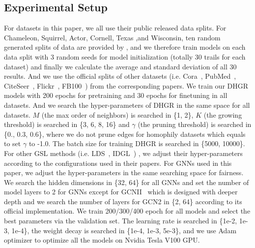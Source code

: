 \documentclass[sigconf]{acmart}
\begin{document}
	\subsection{Experimental Setup}
	For datasets in this paper, we all use their public released data splits. For Chameleon, Squirrel, Actor, Cornell, Texas ,and Wisconsin, ten random generated splits of data are provided by \cite{pei2020geom}, and we therefore train models on each data split with 3 random seeds for model initialization (totally 30 trails for each dataset) and finally we calculate the average and standard deviation of all 30 results. And we use the official splits of other datasets (i.e. Cora~\cite{GCN}, PubMed~\cite{GCN}, CiteSeer~\cite{GCN}, Flickr~\cite{zeng2019graphsaint}, FB100~\cite{lim2021new}) from the corresponding papers. We train our DHGR models with 200 epochs for pretraining and 30 epochs for finetuning in all datasets. And we search the hyper-parameters of DHGR in the same space for all datasets. $M$ (the max order of neighbors) is searched in \{1, 2\}, $K$ (the growing threshold) is searched in \{3, 6, 8, 16\} and $\gamma$ (the pruning threshold) is searched in \{0., 0.3, 0.6\}, where we do not prune edges for homophily datasets which equals to set $\gamma$ to -1.0. The batch size for training DHGR is searched in \{5000, 10000\}. For other GSL methods (i.e. LDS~\cite{LDS}, IDGL~\cite{chen2020iterative}) , we adjust their hyper-parameters according to the configurations used in their papers. For GNNs used in this paper, we adjust the hyper-parameters in the same searching space for fairness. We search the hidden dimensions in \{32, 64\} for all GNNs and set the number of model layers to 2 for GNNs except for GCNII~\cite{GCN2} which is designed with deeper depth and we search the number of layers for GCN2 in \{2, 64\} according to its official implementation. We train 200/300/400 epoch for all models and select the best parameters via the validation set.  The learning rate is searched in \{1e-2, 1e-3, 1e-4\}, the weight decay is searched in \{1e-4, 1e-3, 5e-3\}, and we use Adam optimizer to optimize all the models on Nvidia Tesla V100 GPU. 
\end{document}
